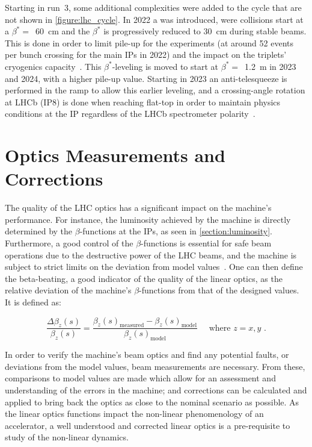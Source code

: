 Starting in \Gls{run}~\num{3}, some additional complexities were added to the cycle that are not shown in \cref{figure:lhc_cycle}.
In \num{2022} a  was introduced, were collisions start at a \(\beta^{\ast} =\)~\qty{60}{\centi\meter} and the \(\beta^{\ast}\) is progressively reduced to \qty{30}{\centi\meter} during stable beams.
This is done in order to limit pile-up for the experiments (at around \num{52} events per bunch crossing for the main IPs in \num{2022}) and the impact on the triplets' cryogenics capacity~\cite{CERN:Fartoukh:LHC_Config_Run3, CERN:Ferlin:Cryogenics}.
This \(\beta^{\ast}\)-leveling is moved to start at \(\beta^{\ast} =\)~\qty{1.2}{\meter} in \num{2023} and \num{2024}, with a higher pile-up value.
Starting in \num{2023} an anti-telesqueeze is performed in the ramp to allow this earlier leveling, and a crossing-angle rotation at LHCb (IP\num{8}) is done when reaching flat-top in order to maintain physics conditions at the IP regardless of the LHCb spectrometer polarity~\cite{CERN:Fartoukh:LHC_Config_Run3}.

\section{Optics Measurements and Corrections}
\label{section:optics_measurements_and_corrections}

The quality of the LHC optics has a significant impact on the machine's performance.
For instance, the luminosity achieved by the machine is directly determined by the \(\beta\)-functions at the IPs, as seen in \cref{section:luminosity}.
Furthermore, a good control of the \(\beta\)-functions is essential for safe beam operations due to the destructive power of the LHC beams, and the machine is subject to strict limits on the deviation from model values~\cite{CERN:Bruning:Field_Quality_Spec_LHC_Main_Dipoles}.
One can then define the \gls{beta-beating}, a good indicator of the quality of the linear optics, as the relative deviation of the machine's \(\beta\)-functions from that of the designed values.
It is defined as:

\begin{equation}
  \frac{\Delta \beta_z(s)}{\beta_z(s)} = \frac{\beta_z(s)_{\mathrm{measured}} - \beta_z(s)_{\mathrm{model}}}{\beta_z(s)_{\mathrm{model}}} \quad \text { where } z = x, y \text{ .}
  \label{equation:beta_beating_definition}
\end{equation}

In order to verify the machine's beam optics and find any potential faults, or deviations from the model values, beam measurements are necessary.
From these, comparisons to model values are made which allow for an assessment and understanding of the errors in the machine; and corrections can be calculated and applied to bring back the optics as close to the nominal scenario as possible.
As the linear optics functions impact the non-linear phenomenology of an accelerator, a well understood and corrected linear optics is a pre-requisite to study of the non-linear dynamics.

